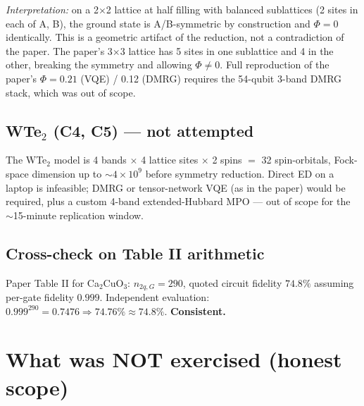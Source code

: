 \documentclass[11pt]{article}
\begin{document}
\noindent \emph{Interpretation:} on a 2$\times$2 lattice at half filling with balanced sublattices (2 sites in each of A, B), the ground state is A/B-symmetric by construction and $\Phi = 0$ identically. This is a geometric artifact of the reduction, not a contradiction of the paper. The paper's 3$\times$3 lattice has 5 sites in one sublattice and 4 in the other, breaking the symmetry and allowing $\Phi \neq 0$. Full reproduction of the paper's $\Phi = 0.21$ (VQE) / 0.12 (DMRG) requires the 54-qubit 3-band DMRG stack, which was out of scope.

\subsection{WTe$_2$ (C4, C5) --- not attempted}

The WTe$_2$ model is 4 bands $\times$ 4 lattice sites $\times$ 2 spins $=$ 32 spin-orbitals, Fock-space dimension up to $\sim 4\times 10^9$ before symmetry reduction. Direct ED on a laptop is infeasible; DMRG or tensor-network VQE (as in the paper) would be required, plus a custom 4-band extended-Hubbard MPO --- out of scope for the $\sim$15-minute replication window.

\subsection{Cross-check on Table II arithmetic}

Paper Table II for Ca$_2$CuO$_3$: $n_{2q,G}=290$, quoted circuit fidelity $74.8\%$ assuming per-gate fidelity $0.999$. Independent evaluation: $0.999^{290} = 0.7476 \Rightarrow 74.76\% \approx 74.8\%$. \textbf{Consistent.}~\checkmark

\section{What was NOT exercised (honest scope)}
\end{document}
